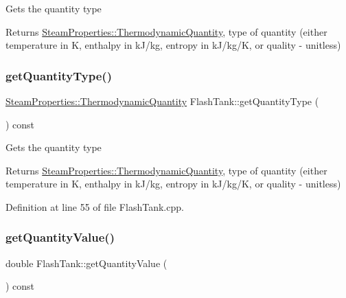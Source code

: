 Gets the quantity type \begin{DoxyReturn}{Returns}
\hyperlink{class_steam_properties_ae0294bedf7d178c2d8fb6aed0f62fbff}{Steam\+Properties\+::\+Thermodynamic\+Quantity}, type of quantity (either temperature in K, enthalpy in k\+J/kg, entropy in k\+J/kg/K, or quality -\/ unitless) 
\end{DoxyReturn}
\mbox{\label{class_flash_tank_a1800317a9b9dd8ff8fb18c693e846a45}} 
\subsubsection{\texorpdfstring{get\+Quantity\+Type()}{getQuantityType()}\hspace{0.1cm}{\footnotesize\ttfamily [3/3]}}
{\footnotesize\ttfamily \hyperlink{class_steam_properties_ae0294bedf7d178c2d8fb6aed0f62fbff}{Steam\+Properties\+::\+Thermodynamic\+Quantity} Flash\+Tank\+::get\+Quantity\+Type (\begin{DoxyParamCaption}{ }\end{DoxyParamCaption}) const}

Gets the quantity type \begin{DoxyReturn}{Returns}
\hyperlink{class_steam_properties_ae0294bedf7d178c2d8fb6aed0f62fbff}{Steam\+Properties\+::\+Thermodynamic\+Quantity}, type of quantity (either temperature in K, enthalpy in k\+J/kg, entropy in k\+J/kg/K, or quality -\/ unitless) 
\end{DoxyReturn}


Definition at line 55 of file Flash\+Tank.\+cpp.

\mbox{\label{class_flash_tank_ab2145598969881df58736a1b65326d17}} 
\subsubsection{\texorpdfstring{get\+Quantity\+Value()}{getQuantityValue()}\hspace{0.1cm}{\footnotesize\ttfamily [1/3]}}
{\footnotesize\ttfamily double Flash\+Tank\+::get\+Quantity\+Value (\begin{DoxyParamCaption}{ }\end{DoxyParamCaption}) const}

